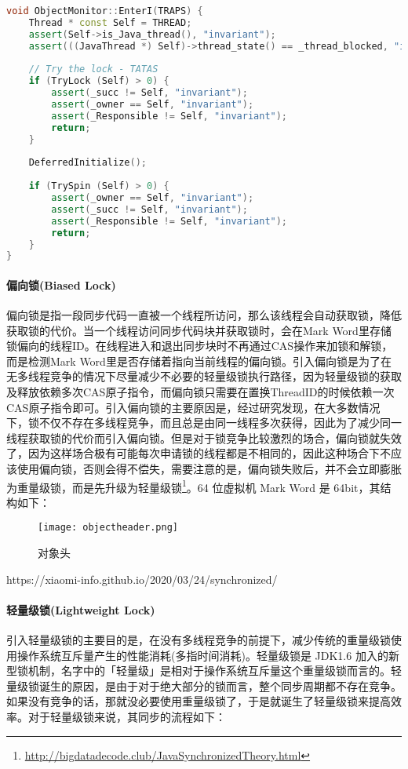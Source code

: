 \documentclass[../../../interview-questions.tex]{subfiles}
\begin{document}
\begin{lstlisting}[language=C++]
void ObjectMonitor::EnterI(TRAPS) {
    Thread * const Self = THREAD;
    assert(Self->is_Java_thread(), "invariant");
    assert(((JavaThread *) Self)->thread_state() == _thread_blocked, "invariant");
    
    // Try the lock - TATAS
    if (TryLock (Self) > 0) {
        assert(_succ != Self, "invariant");
        assert(_owner == Self, "invariant");
        assert(_Responsible != Self, "invariant");
        return;
    }
    
    DeferredInitialize();
    
    if (TrySpin (Self) > 0) {
        assert(_owner == Self, "invariant");
        assert(_succ != Self, "invariant");
        assert(_Responsible != Self, "invariant");
        return;
    }
}      
\end{lstlisting}

\paragraph{偏向锁(Biased Lock)}偏向锁是指一段同步代码一直被一个线程所访问，那么该线程会自动获取锁，降低获取锁的代价。当一个线程访问同步代码块并获取锁时，会在Mark Word里存储锁偏向的线程ID。在线程进入和退出同步块时不再通过CAS操作来加锁和解锁，而是检测Mark Word里是否存储着指向当前线程的偏向锁。引入偏向锁是为了在无多线程竞争的情况下尽量减少不必要的轻量级锁执行路径，因为轻量级锁的获取及释放依赖多次CAS原子指令，而偏向锁只需要在置换ThreadID的时候依赖一次CAS原子指令即可。引入偏向锁的主要原因是，经过研究发现，在大多数情况下，锁不仅不存在多线程竞争，而且总是由同一线程多次获得，因此为了减少同一线程获取锁的代价而引入偏向锁。但是对于锁竞争比较激烈的场合，偏向锁就失效了，因为这样场合极有可能每次申请锁的线程都是不相同的，因此这种场合下不应该使用偏向锁，否则会得不偿失，需要注意的是，偏向锁失败后，并不会立即膨胀为重量级锁，而是先升级为轻量级锁\footnote{\url{http://bigdatadecode.club/JavaSynchronizedTheory.html}}。64 位虚拟机 Mark Word 是 64bit，其结构如下：

\begin{figure}[htbp]
	\centering
	\texttt{[image: objectheader.png]}
	\caption{对象头}
	\label{fig:objectheader}
\end{figure}

https://xiaomi-info.github.io/2020/03/24/synchronized/

\paragraph{轻量级锁(Lightweight Lock)}
引入轻量级锁的主要目的是，在没有多线程竞争的前提下，减少传统的重量级锁使用操作系统互斥量产生的性能消耗(多指时间消耗)。轻量级锁是 JDK1.6 加入的新型锁机制，名字中的「轻量级」是相对于操作系统互斥量这个重量级锁而言的。轻量级锁诞生的原因，是由于对于绝大部分的锁而言，整个同步周期都不存在竞争。如果没有竞争的话，那就没必要使用重量级锁了，于是就诞生了轻量级锁来提高效率。对于轻量级锁来说，其同步的流程如下：
\end{document}

